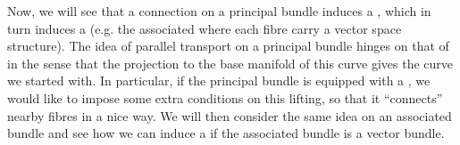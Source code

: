 \documentclass{article}
\begin{document}
Now, we will see that a connection on a principal bundle induces a , which in turn induces a  (e.g. the associated  where each fibre carry a vector space structure). 
 The idea of parallel transport on a principal bundle hinges on that of  in the sense that the projection to the base manifold of this curve gives the curve we started with. In particular, if the principal bundle is equipped with a , we would like to impose some extra conditions on this lifting, so that it ``connects'' nearby fibres in a nice way. We will then consider the same idea on an associated bundle and see how we can induce a  if the associated bundle is a vector bundle. 

\end{document}

